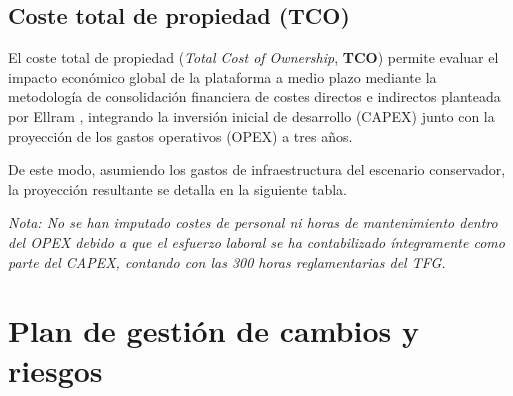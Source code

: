 \subsection{Coste total de propiedad (TCO)}
El coste total de propiedad (\textit{Total Cost of Ownership}, \textbf{TCO}) permite evaluar el impacto económico global de la plataforma a medio plazo mediante la metodología de consolidación financiera de costes directos e indirectos planteada por Ellram \cite{ellram1993total}, integrando la inversión inicial de desarrollo (CAPEX) junto con la proyección de los gastos operativos (OPEX) a tres años.

De este modo, asumiendo los gastos de infraestructura del escenario conservador, la proyección resultante se detalla en la siguiente tabla.

\begin{table}[H]
\centering
\small
\renewcommand{\arraystretch}{1.2}
\caption{Proyección del coste total de propiedad (TCO) a tres años.}
\label{tab:tco_tres_anos}
\end{table}

\textit{Nota: No se han imputado costes de personal ni horas de mantenimiento dentro del OPEX debido a que el esfuerzo laboral se ha contabilizado íntegramente como parte del CAPEX, contando con las 300 horas reglamentarias del TFG.}


\section{Plan de gestión de cambios y riesgos}\label{sec:plan_gestion_cambios_riesgos}

